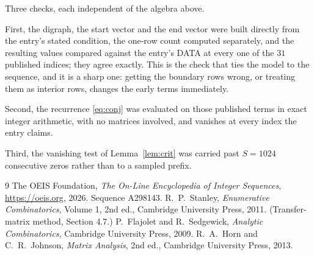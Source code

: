 \documentclass[11pt,a4paper]{article}
\theoremstyle{plain}
\theoremstyle{definition}
\begin{document}
Three checks, each independent of the algebra above.

First, the digraph, the start vector and the end vector were built directly from the
entry's stated condition, the one-row count computed separately, and the resulting values
compared against the entry's DATA at every one of the $31$ published indices; they
agree exactly. This is the check that ties the model to the sequence, and it is a sharp one:
getting the boundary rows wrong, or treating them as interior rows, changes the early terms
immediately.

Second, the recurrence \eqref{eq:conj} was evaluated on those published terms in exact
integer arithmetic, with no matrices involved, and vanishes at every index the entry claims.

Third, the vanishing test of Lemma~\ref{lem:crit} was carried past $S=1024$ consecutive
zeros rather than to a sampled prefix.

\begin{thebibliography}{9}
 The OEIS Foundation, \emph{The On-Line Encyclopedia of Integer
Sequences}, \url{https://oeis.org}, 2026. Sequence A298143.
 R.~P.~Stanley, \emph{Enumerative Combinatorics}, Volume 1, 2nd ed.,
Cambridge University Press, 2011. (Transfer-matrix method, Section 4.7.)
 P.~Flajolet and R.~Sedgewick, \emph{Analytic Combinatorics}, Cambridge
University Press, 2009.
 R.~A.~Horn and C.~R.~Johnson, \emph{Matrix Analysis}, 2nd ed., Cambridge
University Press, 2013.
\end{thebibliography}
\end{document}
